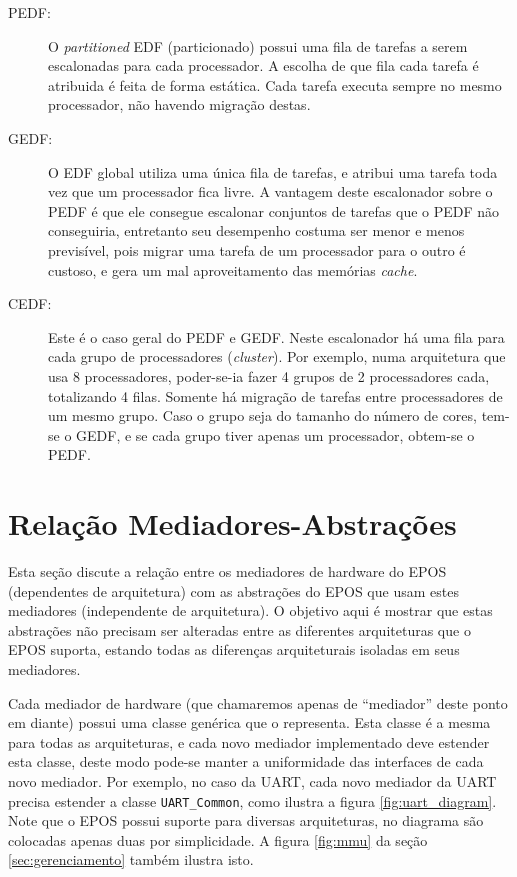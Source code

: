 \begin{description}

\item[PEDF:] O \emph{partitioned} EDF (particionado) possui uma fila de tarefas a serem escalonadas para cada processador. A escolha de que fila cada tarefa é atribuida é feita de forma estática. Cada tarefa executa sempre no mesmo processador, não havendo migração destas. 

\item[GEDF:] O EDF global utiliza uma única fila de tarefas, e atribui uma tarefa toda vez que um processador fica livre. A vantagem deste escalonador sobre o PEDF é que ele consegue escalonar conjuntos de tarefas que o PEDF não conseguiria, entretanto seu desempenho costuma ser menor e menos previsível, pois migrar uma tarefa de um processador para o outro é custoso, e gera um mal aproveitamento das memórias \emph{cache}.

\item[CEDF:] Este é o caso geral do PEDF e GEDF. Neste escalonador há uma fila para cada grupo de processadores (\emph{cluster}). Por exemplo, numa arquitetura que usa 8 processadores, poder-se-ia fazer 4 grupos de 2 processadores cada, totalizando 4 filas. Somente há migração de tarefas entre processadores de um mesmo grupo. Caso o grupo seja do tamanho do número de cores, tem-se o GEDF, e se cada grupo tiver apenas um processador, obtem-se o PEDF.

\end{description}

\section{Relação Mediadores-Abstrações}

Esta seção discute a relação entre os mediadores de hardware do EPOS (dependentes de arquitetura) com as abstrações do EPOS que usam estes mediadores (independente de arquitetura). O objetivo aqui é mostrar que estas abstrações não precisam ser alteradas entre as diferentes arquiteturas que o EPOS suporta, estando todas as diferenças arquiteturais isoladas em seus mediadores.


Cada mediador de hardware (que chamaremos apenas de ``mediador'' deste ponto em diante) possui uma classe genérica que o representa. Esta classe é a mesma para todas as arquiteturas, e cada novo mediador implementado deve estender esta classe, deste modo pode-se manter a uniformidade das interfaces de cada novo mediador. Por exemplo, no caso da UART, cada novo mediador da UART precisa estender a classe \verb+UART_Common+, como ilustra a figura \ref{fig:uart_diagram}. Note que o EPOS possui suporte para diversas arquiteturas, no diagrama são colocadas apenas duas por simplicidade. A figura \ref{fig:mmu} da seção \ref{sec:gerenciamento} também ilustra isto.

